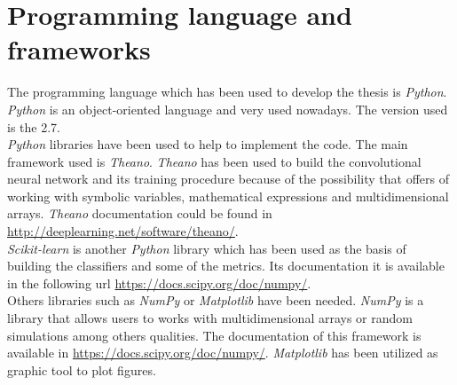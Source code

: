 \section{Programming language and frameworks}
The  programming language which has been used to develop the thesis is \textit{Python}. \textit{Python} is an object-oriented language and very used nowadays. The version used is the 2.7.\\

\textit{Python} libraries have been used to help to implement the code. The main framework used is \textit{Theano}. \textit{Theano} has been used to build the convolutional neural network and its training procedure because of the possibility that offers of working with symbolic variables, mathematical expressions and multidimensional arrays. \textit{Theano} documentation could be found in \url{http://deeplearning.net/software/theano/}.\\

\textit{Scikit-learn} is another \textit{Python} library which has been used as the basis of building the classifiers and some of the metrics. Its documentation it is available in the following url \url{https://docs.scipy.org/doc/numpy/}.\\

Others libraries such as \textit{NumPy} or \textit{Matplotlib} have been needed. \textit{NumPy} is a library that allows users to works with multidimensional arrays or random simulations among others qualities. The documentation of this framework is available in \url{https://docs.scipy.org/doc/numpy/}. \textit{Matplotlib} has been utilized as graphic tool to plot figures.
